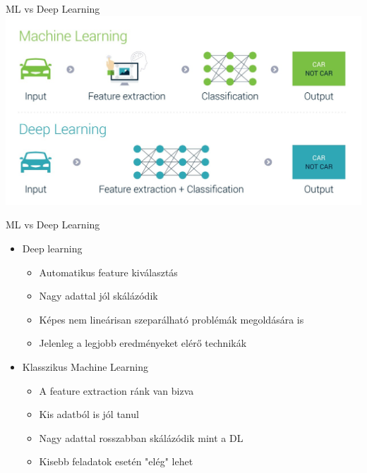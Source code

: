 \documentclass[bigger]{beamer}
\begin{document}
\begin{frame}{ML vs Deep Learning}
	\centering
	\includegraphics[width=.8\textwidth]{fig/ml}
\end{frame}

\begin{frame}{ML vs Deep Learning}
\begin{itemize}
	\item Deep learning
	\begin{itemize}
		\item Automatikus feature kiválasztás
		\item Nagy adattal jól skálázódik
		\item Képes nem lineárisan szeparálható problémák megoldására is
		\item Jelenleg a legjobb eredményeket elérő technikák
	\end{itemize}
\item Klasszikus Machine Learning
\begin{itemize}
	\item A feature extraction ránk van bizva
	\item Kis adatból is jól tanul
	\item Nagy adattal rosszabban skálázódik mint a DL
	\item Kisebb feladatok esetén "elég" lehet
\end{itemize}
\end{itemize}
\end{frame}
\end{document}
